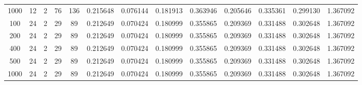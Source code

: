 \begin{table}[h]
\begin{tabular}{ccccccccccccc}
1000 & 12 & 2 & 76 & 136 & 0.215648 & 0.076144 & 0.181913 & 0.363946 & 0.205646 & 0.335361 & 0.299130 & 1.367092 \\
100 & 24 & 2 & 29 & 89 & 0.212649 & 0.070424 & 0.180999 & 0.355865 & 0.209369 & 0.331488 & 0.302648 & 1.367092 \\
200 & 24 & 2 & 29 & 89 & 0.212649 & 0.070424 & 0.180999 & 0.355865 & 0.209369 & 0.331488 & 0.302648 & 1.367092 \\
400 & 24 & 2 & 29 & 89 & 0.212649 & 0.070424 & 0.180999 & 0.355865 & 0.209369 & 0.331488 & 0.302648 & 1.367092 \\
500 & 24 & 2 & 29 & 89 & 0.212649 & 0.070424 & 0.180999 & 0.355865 & 0.209369 & 0.331488 & 0.302648 & 1.367092 \\
1000 & 24 & 2 & 29 & 89 & 0.212649 & 0.070424 & 0.180999 & 0.355865 & 0.209369 & 0.331488 & 0.302648 & 1.367092 \\
\bottomrule
\end{tabular}
\end{table}
